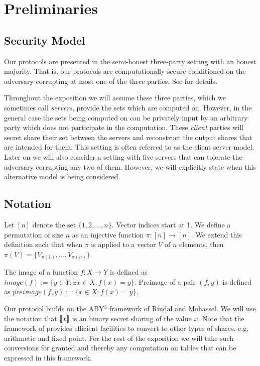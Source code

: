 \section{Preliminaries} \label{sec:prelim}


\subsection{Security Model}

Our protocols are presented in the semi-honest three-party setting with an honest majority. That is, our protocols are computationally secure conditioned on the adversary corrupting at most one of the three parties. See \cite{highthroughput,aby3} for details.


\iffullversion
Throughout the exposition we will assume these three parties, which we sometimes call \emph{servers}, provide the sets which are computed on. However, in the general case the sets being computed on can be privately input by an arbitrary party which does not participate in the computation. These \emph{client} parties will secret share their set between the servers and reconstruct the output shares that are intended for them. This setting is often referred to as the client server model\cite{aby3, secureML}. Later on we will also consider a setting with five servers that can tolerate the adversary corrupting any two of them. However, we will explicitly state when this alternative model is being considered.
\fi


\subsection{Notation}




Let $[n]$ denote the set $\{1,2,...,n\}$. Vector indices start at 1.
We define a permutation of size $n$ as an injective function $\pi : [n] \rightarrow [n]$. We extend this definition such that when $\pi$ is applied to a vector $V$ of $n$ elements, then  $\pi(V)=\{V_{\pi(1)}, ..., V_{\pi(n)}\}$. 

The image of a function $f : X \rightarrow Y$ is defined as $image(f) := \{y\in Y : \exists x\in X, f(x)=y\}$. Preimage of a pair $(f,y)$ is defined as $preimage(f,y):=\{x\in X : f(x) = y\}$.



Our protocol builds on the ABY$^3$ framework of Rindal and Mohassel\cite{aby3}. We will use the notation that $\llbracket x\rrbracket$ is an binary secret sharing of the value $x$. Note that the framework of \cite{aby3} provides efficient facilities to convert to other types of shares, e.g. arithmetic and fixed point. For the rest of the exposition we will take such conversions for granted and thereby any computation on tables that can be expressed in this framework.

